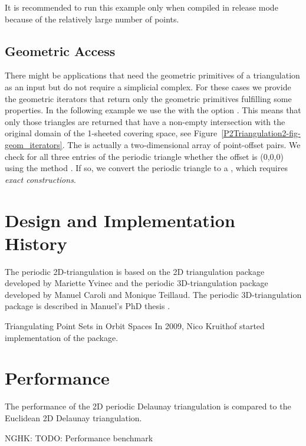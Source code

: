 It is recommended to run this example only when compiled in release
mode because of the relatively large number of points. 


\subsection{Geometric Access}

There might be applications that need the geometric primitives of a
triangulation as an input but do not require a simplicial complex. For
these cases we provide the geometric iterators that return only the
geometric primitives fulfilling some properties. In the following
example we use the  with the option
. This means that only those triangles are
returned that have a non-empty intersection with the original domain
of the 1-sheeted covering space, see
Figure~\ref{P2Triangulation2-fig-geom_iterators}.
The  is actually a two-dimensional array of
point-offset pairs. We check for all three entries of the periodic
triangle whether the offset  is (0,0,0) using the
method . If so, we convert the periodic triangle to a
, which requires \emph{exact constructions}.


\section{Design and Implementation History}
The periodic 2D-triangulation is based on the 2D triangulation package
developed by Mariette Yvinec and the periodic 3D-triangulation package
developed by Manuel Caroli and Monique Teillaud. The periodic
3D-triangulation package is described in Manuel's PhD thesis
\cite{cgal:c-tpsos-10}.

Triangulating Point Sets in Orbit Spaces In 2009, Nico Kruithof
started implementation of the 
package.

\section{Performance}
The performance of the 2D periodic Delaunay triangulation is compared
to the Euclidean 2D Delaunay triangulation.

NGHK: TODO: Performance benchmark
